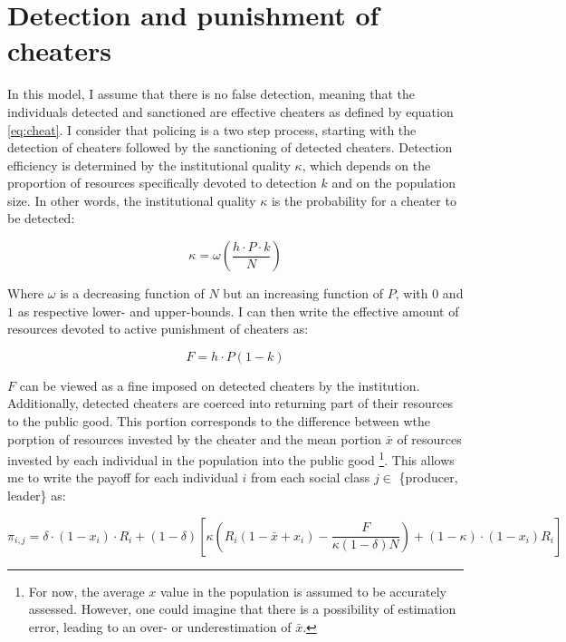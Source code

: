 \documentclass[a4paper]{article}
\begin{document}
\section{Detection and punishment of cheaters}
\label{sec:cheat}

In this model, I assume that there is no false detection, meaning that the individuals detected and sanctioned are effective cheaters as defined by equation \ref{eq:cheat}. I consider that policing is a two step process, starting with the detection of cheaters followed by the sanctioning of detected cheaters. Detection efficiency is determined by the institutional quality $\kappa$, which depends on the proportion of resources specifically devoted to detection $k$ and on the population size. In other words, the institutional quality $\kappa$ is the probability for a cheater to be detected:

\begin{equation}
\kappa=\omega\left(\frac{h\cdot P\cdot k}{N}\right)
\end{equation} 

Where $\omega$ is a decreasing function of $N$ but an increasing function of $P$, with $0$ and $1$ as respective lower- and upper-bounds. I can then write the effective amount of resources devoted to active punishment of cheaters as:

\begin{equation}
F=h\cdot P\left(1-k\right)
\end{equation}

$F$ can be viewed as a fine imposed on detected cheaters by the institution. Additionally, detected cheaters are coerced into returning part of their resources to the public good. This portion corresponds to the difference between wthe porption of resources invested by the cheater and the mean portion $\bar{x}$ of resources invested by each individual in the population into the public good \footnote{For now, the average $x$ value in the population is assumed to be accurately assessed. However, one could imagine that there is a possibility of estimation error, leading to an over- or underestimation of $\bar{x}$.}. This allows me to write the payoff for each individual $i$ from each social class $j\in$ \{producer, leader\} as:

\begin{equation}
\pi_{i,j}=\delta\cdot(1-x_i)\cdot R_i+\left(1-\delta\right)\left[\kappa\left(R_i\left(1-\bar{x}+x_i\right)-\frac{F}{\kappa\left(1-\delta\right)N}\right)+\left(1-\kappa\right)\cdot(1-x_i)R_i\right] 
\end{equation}
\end{document}
